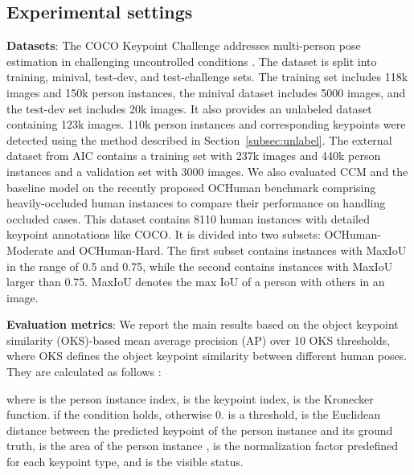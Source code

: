 \documentclass[twocolumn]{svjour3}          \smartqed  \usepackage{natbib}
\begin{document}
\subsection{Experimental settings}
\label{subsec:settings}
\textbf{Datasets}: The COCO Keypoint Challenge addresses multi-person pose estimation in challenging uncontrolled conditions \citep{lin2014microsoft}. The dataset is split into training, minival, test-dev, and test-challenge sets. The training set includes 118k images and 150k person instances, the minival dataset includes 5000 images, and the test-dev set includes 20k images. It also provides an unlabeled dataset containing 123k images. 110k person instances and corresponding keypoints were detected using the method described in Section~\ref{subsec:unlabel}. The external dataset from AIC contains a training set with 237k images and 440k person instances and a validation set with 3000 images. We also evaluated CCM and the baseline model on the recently proposed OCHuman benchmark \citep{zhang2019pose} comprising heavily-occluded human instances to compare their performance on handling occluded cases. This dataset contains 8110 human instances with detailed keypoint annotations like COCO. It is divided into two subsets: OCHuman-Moderate and OCHuman-Hard. The first subset contains instances with MaxIoU in the range of 0.5 and 0.75, while the second contains instances with MaxIoU larger than 0.75. MaxIoU denotes the max IoU of a person with others in an image.

\textbf{Evaluation metrics}: We report the main results based on the object keypoint similarity (OKS)-based mean average precision (AP) over 10 OKS thresholds, where OKS defines the object keypoint similarity between different human poses. They are calculated as follows \citep{lin2014microsoft}:



where  is the person instance index,  is the keypoint index,  is the Kronecker function.  if the condition holds, otherwise 0.  is a threshold,  is the Euclidean distance between the predicted  keypoint of the person instance  and its ground truth,  is the area of the person instance ,  is the normalization factor predefined for each keypoint type, and  is the visible status.
\end{document}
